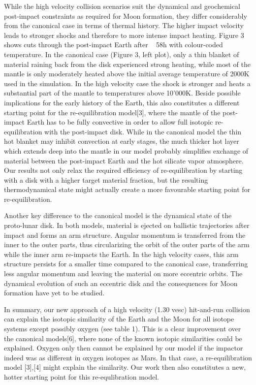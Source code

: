 While the high velocity collision scenarios suit the dynamical and geochemical post-impact constraints as required for Moon formation, they differ considerably from the canonical case in terms of thermal history. The higher impact velocity leads to stronger shocks and therefore to more intense impact heating. Figure 3 shows cuts through the post-impact Earth after ~ 58h with colour-coded temperature. In the canonical case (Figure 3, left plot), only a thin blanket of material raining back from the disk experienced strong heating, while most of the mantle is only moderately heated above the initial average temperature of 2000K used in the simulation. In the high velocity case the shock is stronger and heats a substantial part of the mantle to temperatures above 10'000K. Beside possible implications for the early history of the Earth, this also constitutes a different starting point for the re-equilibration model[3], where the mantle of the post-impact Earth has to be fully convective in order to allow full isotopic re-equilibration with the post-impact disk. While in the canonical model the thin hot blanket may inhibit convection at early stages, the much thicker hot layer which extends deep into the mantle in our model probably simplifies exchange of material between the post-impact Earth and the hot silicate vapor atmosphere. Our results not only relax the required efficiency of re-equilibration by starting with a disk with a higher target material fraction, but the resulting thermodynamical state might actually create a more favourable starting point for re-equilibration.

Another key difference to the canonical model is the dynamical state of the proto-lunar disk. In both models, material is ejected on ballistic trajectories after impact and forms an arm structure. Angular momentum is transferred from the inner to the outer parts, thus circularizing the orbit of the outer parts of the arm while the inner arm re-impacts the Earth. In the high velocity cases, this arm structure persists for a smaller time compared to the canonical case, transferring less angular momentum and leaving the material on more eccentric orbits. The dynamical evolution of such an eccentric disk and the consequences for Moon formation have yet to be studied.

In summary, our new approach of a high velocity (1.30 vesc) hit-and-run collision can explain the isotopic similarity of the Earth and the Moon for all isotope systems except possibly oxygen (see table 1). This is a clear improvement over the canonical models[6], where none of the known isotopic similarities could be explained. Oxygen only then cannot be explained by our model if the impactor indeed was as different in oxygen isotopes as Mars. In that case, a re-equilibration model [3],[4] might explain the similarity. Our work then also constitutes a new, hotter starting point for this re-equlibration model. 

